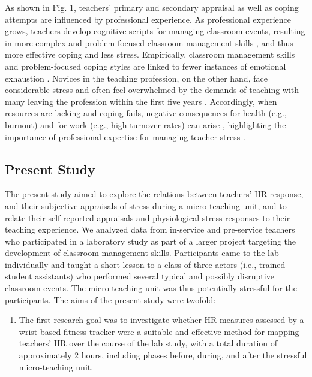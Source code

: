 \documentclass[preprint, 3p,
sort,]{elsarticle} %
\providecommand{\tightlist}{%
  \setlength{\itemsep}{0pt}\setlength{\parskip}{0pt}}
\begin{document}
As shown in Fig. 1, teachers' primary and secondary appraisal as well as
coping attempts are influenced by professional experience. As
professional experience grows, teachers develop cognitive scripts for
managing classroom events, resulting in more complex and problem-focused
classroom management skills \citep{wolff2021classroom}, and thus more
effective coping and less stress. Empirically, classroom management
skills and problem-focused coping styles are linked to fewer instances
of emotional exhaustion \citep{maslach2001job, clunies2008self}. Novices
in the teaching profession, on the other hand, face considerable stress
and often feel overwhelmed by the demands of teaching
\citep{ophardt2017klassenmanagement, wolff2015keeping, klusmann2012berufliche}
with many leaving the profession within the first five years
\citep{ingersoll2003}. Accordingly, when resources are lacking and
coping fails, negative consequences for health (e.g., burnout) and for
work (e.g., high turnover rates) can arise
\citep{jalongo2006, unterbrink2007, aloe2014multivariate}, highlighting
the importance of professional expertise for managing teacher stress
\citep{fisher2011}.

\subsection{Present Study}\label{present-study}

The present study aimed to explore the relations between teachers' HR
response, and their subjective appraisals of stress during a
micro-teaching unit, and to relate their self-reported appraisals and
physiological stress responses to their teaching experience. We analyzed
data from in-service and pre-service teachers who participated in a
laboratory study as part of a larger project targeting the development
of classroom management skills. Participants came to the lab
individually and taught a short lesson to a class of three actors (i.e.,
trained student assistants) who performed several typical and possibly
disruptive classroom events. The micro-teaching unit was thus
potentially stressful for the participants. The aims of the present
study were twofold:

\begin{enumerate}
\def\labelenumi{(\arabic{enumi})}
\tightlist
\item
  The first research goal was to investigate whether HR measures
  assessed by a wrist-based fitness tracker were a suitable and
  effective method for mapping teachers' HR over the course of the lab
  study, with a total duration of approximately 2 hours, including
  phases before, during, and after the stressful micro-teaching unit.
\end{enumerate}
\end{document}

